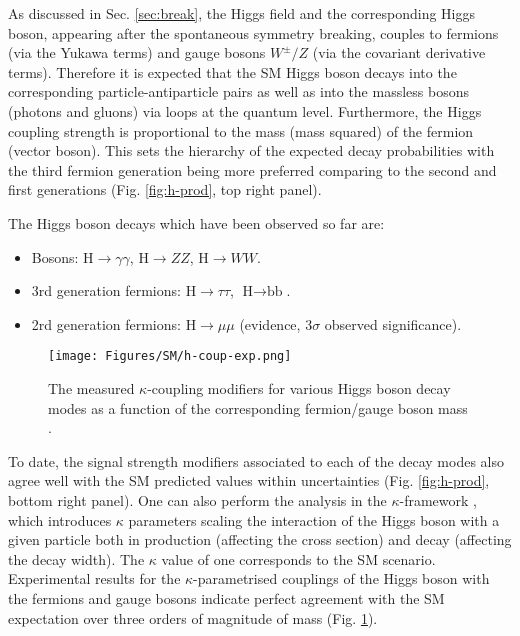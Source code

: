 As discussed in Sec. \ref{sec:break}, the Higgs field and the corresponding Higgs boson, appearing after the spontaneous symmetry breaking, couples to fermions (via the Yukawa terms) and gauge bosons $W^\pm/Z$ (via the covariant derivative terms). Therefore it is expected that the SM Higgs boson decays into the corresponding particle-antiparticle pairs as well as into the massless bosons (photons and gluons) via loops at the quantum level. Furthermore, the Higgs coupling strength is proportional to the mass (mass squared) of the fermion (vector boson). This sets the hierarchy of the expected decay probabilities with the third fermion generation being more preferred comparing to the second and first generations (Fig. \ref{fig:h-prod}, top right panel). 

The Higgs boson decays which have been observed so far are:
\begin{itemize}
    \item Bosons: $\text{H} \to \gamma\gamma$, $\text{H} \to ZZ$, $\text{H} \to WW$.
    \item 3rd generation fermions: $\text{H} \to \tau\tau$, $\text{H} \to \text{bb}$.
    \item 2rd generation fermions: $\text{H} \to \mu\mu$ (evidence, $3\sigma$ observed significance).
\end{itemize}

\begin{figure}[!ht]
    \centering
    \texttt{[image: Figures/SM/h-coup-exp.png]}
    \caption{The measured $\kappa$-coupling modifiers for various Higgs boson decay modes as a function of the corresponding fermion/gauge boson mass \cite{CMS:2022dwd}.}
    \label{fig:h-coup}
\end{figure}

To date, the signal strength modifiers associated to each of the decay modes also agree well with the SM predicted values within uncertainties (Fig. \ref{fig:h-prod}, bottom right panel). One can also perform the analysis in the $\kappa$-framework \cite{LHCHiggsCrossSectionWorkingGroup:2013rie}, which introduces $\kappa$ parameters scaling the interaction of the Higgs boson with a given particle both in production (affecting the cross section) and decay (affecting the decay width). The $\kappa$ value of one corresponds to the SM scenario. Experimental results for the $\kappa$-parametrised couplings of the Higgs boson with the fermions and gauge bosons indicate perfect agreement with the SM expectation over three orders of magnitude of mass (Fig. \ref{fig:h-coup}).  

